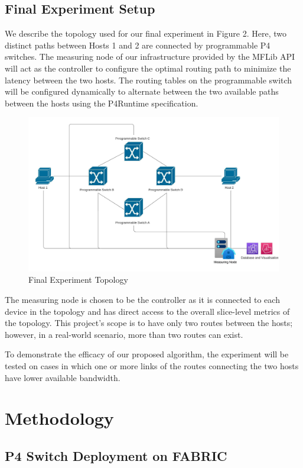 \documentclass[conference]{IEEEtran}
\begin{document}
    \subsection{Final Experiment Setup}
    We describe the topology used for our final experiment in Figure 2. Here, two distinct paths between Hosts 1 and 2 are connected by programmable P4 switches. The measuring node of our infrastructure provided by the MFLib API will act as the controller to configure the optimal routing path to minimize the latency between the two hosts. The routing tables on the programmable switch will be configured dynamically to alternate between the two available paths between the hosts using the P4Runtime specification.
    \begin{figure}[h]
        \centering
        \includegraphics[scale=0.4]{Final_Switch_Topology.jpeg}
        \caption{Final Experiment Topology}
    \end{figure}

    The measuring node is chosen to be the controller as it is connected to each device in the topology and has direct access to the overall slice-level metrics of the topology. This project's scope is to have only two routes between the hosts; however, in a real-world scenario, more than two routes can exist.

    To demonstrate the efficacy of our proposed algorithm, the experiment will be tested on cases in which one or more links of the routes connecting the two hosts have lower available bandwidth.




    \section{Methodology}
    \subsection{P4 Switch Deployment on FABRIC}
\end{document}

